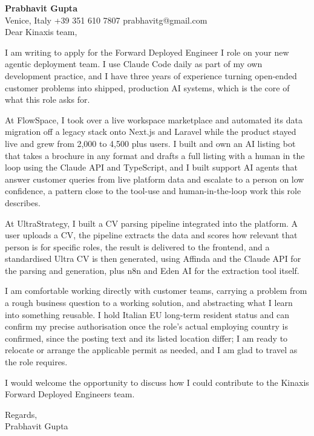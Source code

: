 \documentclass[a4paper,10.5pt]{article}
\begin{document}
\textbf{Prabhavit Gupta}\\
Venice, Italy \textbar{} +39 351 610 7807 \textbar{} prabhavitg@gmail.com\\[10pt]
Dear Kinaxis team,

I am writing to apply for the Forward Deployed Engineer I role on your new agentic deployment team. I use Claude Code daily as part of my own development practice, and I have three years of experience turning open-ended customer problems into shipped, production AI systems, which is the core of what this role asks for.

At FlowSpace, I took over a live workspace marketplace and automated its data migration off a legacy stack onto Next.js and Laravel while the product stayed live and grew from 2,000 to 4,500 plus users. I built and own an AI listing bot that takes a brochure in any format and drafts a full listing with a human in the loop using the Claude API and TypeScript, and I built support AI agents that answer customer queries from live platform data and escalate to a person on low confidence, a pattern close to the tool-use and human-in-the-loop work this role describes.

At UltraStrategy, I built a CV parsing pipeline integrated into the platform. A user uploads a CV, the pipeline extracts the data and scores how relevant that person is for specific roles, the result is delivered to the frontend, and a standardised Ultra CV is then generated, using Affinda and the Claude API for the parsing and generation, plus n8n and Eden AI for the extraction tool itself.

I am comfortable working directly with customer teams, carrying a problem from a rough business question to a working solution, and abstracting what I learn into something reusable. I hold Italian EU long-term resident status and can confirm my precise authorisation once the role's actual employing country is confirmed, since the posting text and its listed location differ; I am ready to relocate or arrange the applicable permit as needed, and I am glad to travel as the role requires.

I would welcome the opportunity to discuss how I could contribute to the Kinaxis Forward Deployed Engineers team.

Regards,\\
Prabhavit Gupta
\end{document}
